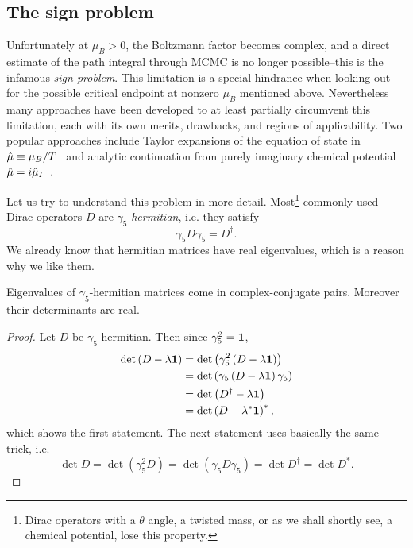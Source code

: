\subsection{The sign problem}\label{sec:signProblem}


Unfortunately at $\mu_B>0$, the Boltzmann factor becomes complex, and a 
direct estimate of the path 
integral through MCMC is no longer possible--this is the infamous {\it sign problem}.
This limitation is a special hindrance when looking out for the possible critical 
endpoint at nonzero $\mu_B$ mentioned above. 
Nevertheless many approaches have been developed to at least partially circumvent this limitation, 
each with its own merits, drawbacks, and regions of applicability.
Two popular approaches include Taylor expansions of the equation of state in 
$\hat{\mu}\equiv\mu_B/T$~\cite{Allton:2002zi, Allton:2003vx, Gavai:2003mf} and analytic continuation 
from purely imaginary chemical potential  $\hat{\mu}=i\hat{\mu}_I$~\cite{deForcrand:2002hgr, DElia:2002tig}.

Let us try to understand this problem in more detail.
Most\footnote{Dirac operators with a $\theta$ angle, a twisted mass,
or as we shall shortly see, a chemical potential, lose this property.} 
commonly used Dirac operators $D$ are
$\gamma_5$-{\it hermitian}, i.e. they satisfy
\begin{equation}
\gamma_5 D\gamma_5=D^\dagger.
\end{equation}
We already know that hermitian matrices have real eigenvalues, which
is a reason why we like them. 
\begin{proposition}{}{}
Eigenvalues of $\gamma_5$-hermitian matrices come in complex-conjugate pairs.
Moreover their determinants are real.
\begin{proof}
Let $D$ be $\gamma_5$-hermitian. Then since $\gamma_5^2={\mathbf 1}$,
\begin{equation*}\begin{aligned}
\det\left(D-\lambda{\mathbf 1}\right)
&=\det\left(\gamma_5^2\left(D-\lambda{\mathbf 1}\right)\right)\\
&=\det\left(\gamma_5\left(D-\lambda{\mathbf 1}\right)\gamma_5\right)\\
&=\det\left(D^\dagger-\lambda{\mathbf 1}\right)\\
&=\det\left(D-\lambda^*{\mathbf 1}\right)^*,\\
\end{aligned}\end{equation*}
which shows the first statement. The next statement uses basically
the same trick, i.e.
$$
\det D 
= \det\left(\gamma_5^2 D\right) 
= \det\left(\gamma_5 D\gamma_5\right) 
= \det D^\dagger
= \det D^*.
$$
\end{proof}
\end{proposition}

